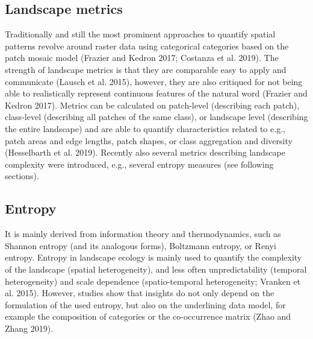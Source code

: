 \documentclass[
  10pt,
  a4paperpaper,
]{article}
\begin{document}
\subsection{Landscape metrics}\label{landscape-metrics}

Traditionally and still the most prominent approaches to quantify
spatial patterns revolve around raster data using categorical categories
based on the patch mosaic model (Frazier and Kedron 2017; Costanza et
al. 2019). The strength of landscape metrics is that they are comparable
easy to apply and communicate (Lausch et al. 2015), however, they are
also critiqued for not being able to realistically represent continuous
features of the natural word (Frazier and Kedron 2017). Metrics can be
calculated on patch-level (describing each patch), class-level
(describing all patches of the same class), or landscape level
(describing the entire landscape) and are able to quantify
characteristics related to e.g., patch areas and edge lengths, patch
shapes, or class aggregation and diversity (Hesselbarth et al. 2019).
Recently also several metrics describing landscape complexity were
introduced, e.g., several entropy measures (see following sections).

\subsection{Entropy}\label{entropy}

It is mainly derived from information theory and thermodynamics, such as
Shannon entropy (and its analogous forms), Boltzmann entropy, or Renyi
entropy. Entropy in landscape ecology is mainly used to quantify the
complexity of the landscape (spatial heterogeneity), and less often
unpredictability (temporal heterogeneity) and scale dependence
(spatio-temporal heterogeneity; Vranken et al. 2015). However, studies
show that insights do not only depend on the formulation of the used
entropy, but also on the underlining data model, for example the
composition of categories or the co-occurrence matrix (Zhao and Zhang
2019).
\end{document}
